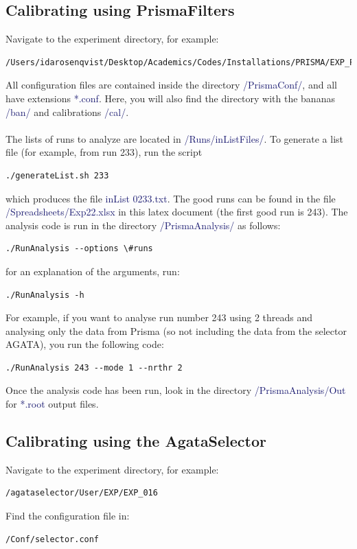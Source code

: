 \documentclass{article}
\begin{document}
\subsection{Calibrating using PrismaFilters}
Navigate to the experiment directory, for example:
\begin{Verbatim}[formatcom=\color{MidnightBlue}]
/Users/idarosenqvist/Desktop/Academics/Codes/Installations/PRISMA/EXP_PHD/PrismaAnalysis
\end{Verbatim}
All configuration files are contained inside the directory \textcolor{MidnightBlue}{/PrismaConf/}, and all have extensions \textcolor{MidnightBlue}{*.conf}. Here, you will also find the directory with the bananas \textcolor{MidnightBlue}{/ban/} and calibrations \textcolor{MidnightBlue}{/cal/}.\\\\
The lists of runs to analyze are located in \textcolor{MidnightBlue}{/Runs/inListFiles/}. To generate a list file (for example, from run 233), run the script
\begin{Verbatim}[formatcom=\color{OliveGreen}]
./generateList.sh 233
\end{Verbatim}
which produces the file \textcolor{MidnightBlue}{ inList 0233.txt}. The good runs can be found in the file \textcolor{MidnightBlue}{/Spreadsheets/Exp22.xlsx} in this latex document (the first good run is 243). The analysis code is run in the directory \textcolor{MidnightBlue}{/PrismaAnalysis/} as follows:
\begin{Verbatim}[formatcom=\color{OliveGreen}]
./RunAnalysis --options \#runs
\end{Verbatim}
for an explanation of the arguments, run:
\begin{Verbatim}[formatcom=\color{OliveGreen}]
./RunAnalysis -h
\end{Verbatim}
For example, if you want to analyse run number 243 using 2 threads and analysing only the data from Prisma (so not including the data from the selector AGATA), you run the following code:
\begin{Verbatim}[formatcom=\color{OliveGreen}]
./RunAnalysis 243 --mode 1 --nrthr 2
\end{Verbatim}
Once the analysis code has been run, look in the directory \textcolor{MidnightBlue}{/PrismaAnalysis/Out} for \textcolor{MidnightBlue}{*.root} output files.

\subsection{Calibrating using the AgataSelector}
Navigate to the experiment directory, for example:
\begin{Verbatim}[formatcom=\color{MidnightBlue}]
/agataselector/User/EXP/EXP_016
\end{Verbatim}
Find the configuration file in:
\begin{Verbatim}[formatcom=\color{MidnightBlue}]
/Conf/selector.conf
\end{Verbatim}
\end{document}
